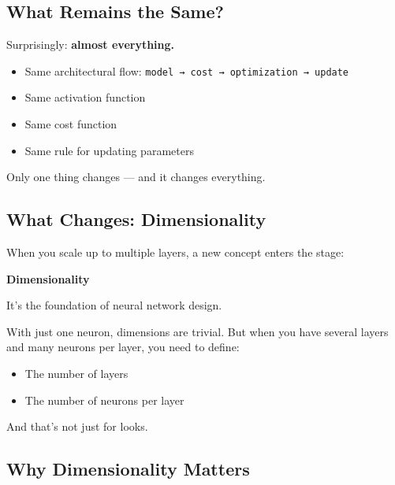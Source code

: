 \documentclass[11pt]{article}
\begin{document}
\vspace{1em}

\subsection*{What Remains the Same?}

Surprisingly: \textbf{almost everything.}

\begin{itemize}
    \item Same architectural flow: \texttt{model → cost → optimization → update}
    \item Same activation function
    \item Same cost function
    \item Same rule for updating parameters
\end{itemize}

\vspace{0.5em}

Only one thing changes — and it changes everything.

\vspace{1em}

\subsection*{What Changes: Dimensionality}

When you scale up to multiple layers, a new concept enters the stage:

\begin{center}
\Large \textbf{Dimensionality}
\end{center}

\vspace{0.5em}

It’s the foundation of neural network design.

With just one neuron, dimensions are trivial.  
But when you have several layers and many neurons per layer, you need to define:

\begin{itemize}
    \item The number of layers
    \item The number of neurons per layer
\end{itemize}

And that’s not just for looks.

\vspace{1em}

\subsection*{Why Dimensionality Matters}
\end{document}
